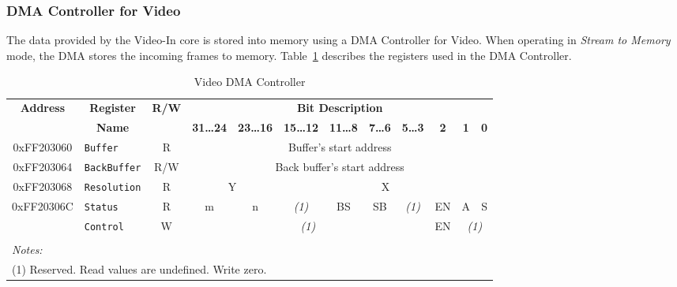 \subsubsection{DMA Controller for Video}
\label{sec:dma_video}

The data provided by the Video-In core is stored into memory using a DMA Controller for Video. When
operating in {\it Stream to Memory} mode, the DMA stores the incoming frames to memory. 
Table~\ref{tab:video_dma} describes the registers used in the DMA Controller.

\begin{table}[h]
    \centering
    \begin{tabular}{|c|l|c|c|c|c|c|c|c|c|c|c|}
        \hline
            \textbf{Address}
            & \multicolumn{1}{c|}{\textbf{Register}}
            & \multirow{2}{*}{\textbf{R/W}}
            & \multicolumn{9}{c|}{\textbf{Bit Description}}
        \\\cline{4-12}
            & \multicolumn{1}{c|}{\textbf{Name}}
            &
            & \textbf{31\ldots24}
            & \textbf{23\ldots16}
            & \textbf{15\ldots12}
            & \textbf{11\ldots8}
            & \textbf{7\ldots6}
            & \textbf{5\ldots3}
            & \textbf{2}
            & \textbf{1}
            & \textbf{0}
        \\\hline
            0xFF203060
            & \texttt{Buffer}
            & R
            & \multicolumn{9}{c|}{Buffer's start address}
        \\\hline
            0xFF203064
            & \texttt{BackBuffer}
            & R/W
            & \multicolumn{9}{c|}{Back buffer's start address}
        \\\hline
            0xFF203068
            & \texttt{Resolution}
            & R
            & \multicolumn{2}{c|}{Y}
            & \multicolumn{7}{c|}{X}
        \\\hline
            \multirow{2}{*}{0xFF20306C}
            & \texttt{Status}
            & R
            & m
            & n
            & {\footnotesize \it (1)}
            & BS
				& SB
            & {\footnotesize \it (1)}
            & EN
            & A
            & S
        \\\cline{2-12}

            & \texttt{Control}
            & W
            & \multicolumn{6}{c|}{\footnotesize \it (1)}
				& EN
            & \multicolumn{2}{c|}{\footnotesize \it (1)}
        \\\hline
                \multicolumn{11}{l}{}
        \\
                \multicolumn{11}{l}{\footnotesize \it{Notes: }}
        \\
                \multicolumn{11}{l}{\footnotesize{(1) Reserved. Read values are undefined. Write zero.}}
    \end{tabular}
		\caption{Video DMA Controller}
		\label{tab:video_dma}
\end{table}

